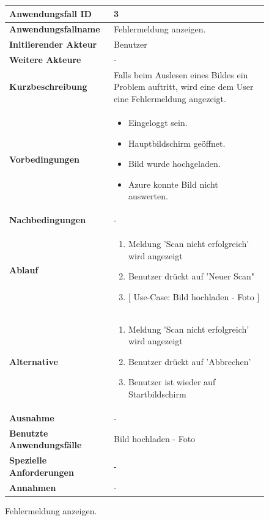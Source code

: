 \begin{figure}[h]
	\centering
	\begin{tabularx}{\textwidth}{ X | X }
		\textbf{Anwendungsfall ID} & 3 \\ \hline
		\textbf{Anwendungsfallname} & Fehlermeldung anzeigen. \\ \hline
		\textbf{Initiierender Akteur} & Benutzer \\ \hline
		\textbf{Weitere Akteure} & - \\ \hline
		\textbf{Kurzbeschreibung} & Falls beim Auslesen eines Bildes ein Problem auftritt, wird eine dem User eine Fehlermeldung angezeigt.   \\ \hline
		\textbf{Vorbedingungen} & 
		\begin {itemize}
			\item Eingeloggt sein. 
			\item Hauptbildschirm geöffnet.
			\item Bild wurde hochgeladen.
			\item Azure konnte Bild nicht auswerten.
		\end{itemize}\\ \hline
		\textbf{Nachbedingungen} & - \\ \hline
		\textbf{Ablauf} &
		\begin{enumerate}
			\item Meldung 'Scan nicht erfolgreich' wird angezeigt
			\item Benutzer drückt auf 'Neuer Scan"
			\item $\lbrack$ Use-Case: Bild hochladen - Foto $\rbrack$
		\end{enumerate} \\ \hline
		\textbf{Alternative} & 
		\begin{enumerate}
			\item Meldung 'Scan nicht erfolgreich' wird angezeigt
			\item Benutzer drückt auf 'Abbrechen'
			\item Benutzer ist wieder auf Startbildschirm
		\end{enumerate} \\ \hline
		\textbf{Ausnahme} & -   \\ \hline
		\textbf{Benutzte Anwendungsfälle} & Bild hochladen - Foto \\ \hline
		\textbf{Spezielle Anforderungen} & - \\ \hline
		\textbf{Annahmen} & -
	\end{tabularx}
	\caption{Fehlermeldung anzeigen.}
	\label{fig:anwendungsfall-server-tabelle-xx-1}
\end{figure}

